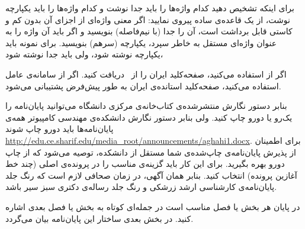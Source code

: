 	 برای اینکه تشخیص دهید کدام واژه‌ها را باید جدا نوشت و کدام واژه‌ها را باید یکپارچه نوشت، از یک قاعده‌ی ساده پیروی نمایید:
	اگر معنی واژه‌ای از اجزای آن بدون کم و کاستی قابل برداشت است، آن را جدا (با نیم‌فاصله) بنویسید و اگر باید آن واژه را به عنوان واژه‌ای مستقل به خاطر سپرد،
	یکپارچه (سرهم) بنویسید. برای نمونه  باید یکپارچه نوشته شود، ولی  باید جدا نوشته شود،
	
	 اگر از   استفاده می‌کنید، صفحه‌کلید  ایران را از~ دریافت کنید. اگر از  سامانه‌ی عامل  استفاده می‌کنید،   صفحه‌کلید استانده‌ی ایران  به طور پیش‌فرض پشتیبانی می‌شود.
	

بنابر دستور نگارش منتشرشده‌ی کتاب‌خانه‌ی مرکزی دانشگاه می‌توانید پایان‌نامه را یک‌رو یا دورو چاپ کنید. ولی بنابر دستور نگارش دانشکده‌ی مهندسی کامپیوتر همه‌ی پایان‌نامه‌ها باید دورو چاپ شوند
{\url{http://edu.ce.sharif.edu/media_root/announcements/aghahi1.docx}}.
برای اطمینان از پذیرش پایان‌نامه‌ی چاپ‌شده‌ی شما مستقل از دانشکده، توصیه می‌شود که از چاپ دورو بهره بگیرید. برای این کار باید گزینه‌ی مناسب را در پرونده‌ی اصلی (چند خط آغازین پرونده) انتخاب کنید.
بنابر همان آگهی، در زمان صحافی لازم است که رنگ جلد پایان‌نامه‌ی کارشناسی ارشد زرشکی و رنگ جلد رساله‌ی دکتری سبز سیر باشد.

در پایان هر بخش یا فصل مناسب است در جمله‌ای کوتاه به بخش یا فصل بعدی اشاره کنید. در بخش بعدی ساختار این پایان‌نامه بیان می‌گردد.
